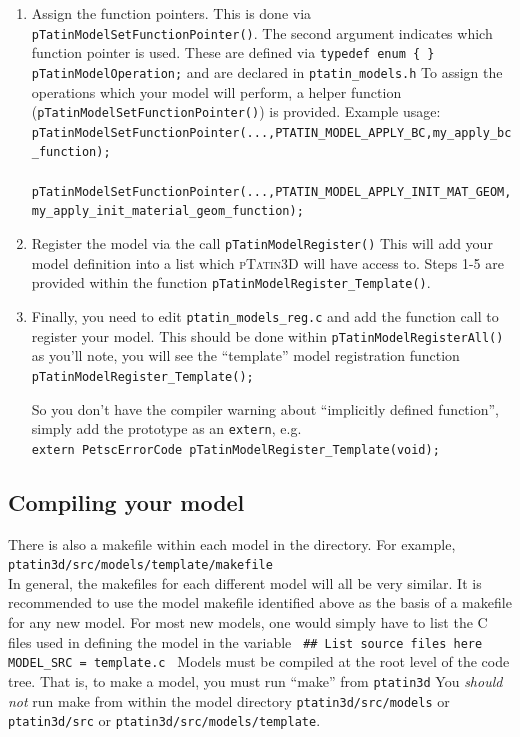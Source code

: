 \documentclass[paper=a4, fontsize=11pt,twoside]{scrartcl}
\newcommand{\ptat}{{{\textsc{pTatin3D}}}}
\newcommand{\shellcmd}[1]{\\\indent\indent\texttt{\hspace{5mm}\footnotesize #1}\\}
\newcommand{\unix}[1]{\texttt{\footnotesize #1}}
\begin{document}
{{\begin{enumerate}
	\item Assign the function pointers. This is done via \unix{pTatinModelSetFunctionPointer()}.
The second argument indicates which function pointer is used. These are defined via
\unix{typedef enum \{ \} pTatinModelOperation;}
and are declared in 
\unix{ptatin\_models.h}
To assign the operations which your model will perform, a helper function (\unix{pTatinModelSetFunctionPointer()}) is provided.
Example usage:
\shellcmd{pTatinModelSetFunctionPointer(...,PTATIN\_MODEL\_APPLY\_BC,my\_apply\_bc\_function);}
\shellcmd{pTatinModelSetFunctionPointer(...,PTATIN\_MODEL\_APPLY\_INIT\_MAT\_GEOM,my\_apply\_init\_material\_geom\_function);} %

	\item Register the model via the call
\unix{pTatinModelRegister()}
This will add your model definition into a list which {\ptat} will have access to.
Steps 1-5 are provided within the function \unix{pTatinModelRegister\_Template()}.

	\item Finally, you need to edit
	\unix{ptatin\_models\_reg.c}
and add the function call to register your model.
This should be done within
		\unix{pTatinModelRegisterAll()}
as you'll note, you will see the ``template'' model registration function 	
		\unix{pTatinModelRegister\_Template();}

So you don't have the compiler warning about ``implicitly defined function'', simply add the prototype as an \unix{extern}, e.g.
	\shellcmd{extern PetscErrorCode pTatinModelRegister\_Template(void);}
\end{enumerate}

\subsection{Compiling your model}
There is also a makefile within each model in the directory.
For example,
	\shellcmd{ptatin3d/src/models/template/makefile}
In general, the makefiles for each different model will all be very similar.
It is recommended to use the model makefile identified above as the basis of a makefile for any new model.
For most new models, one would simply have to list the C files used in defining the model in the variable
\newline
\unix{
\#\# List source files here \newline
MODEL\_SRC = \newline
        template.c \newline
}
Models must be compiled at the root level of the code tree.
That is, to make a model, you must run ``make'' from 
	\unix{ptatin3d}
You \textit{should not} run make from within the model directory
	\unix{ptatin3d/src/models}
or
	\unix{ptatin3d/src}
or
	\unix{ptatin3d/src/models/template}.

}}
\end{document}
